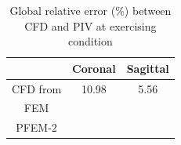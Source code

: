 \begin{table}[h]
\caption {Global relative error (\%) between CFD and PIV at exercising condition} \label{tab:convergence}
\centering
\begin{tabular}{|c|c|c|}
\hline
       & Coronal & Sagittal \\ \hline
CFD from \cite{craven_cfd}  & 10.98	&5.56 \\ \hline
FEM    &      &    \\ \hline
PFEM-2 &     &       \\ \hline
\end{tabular}
\end{table}
